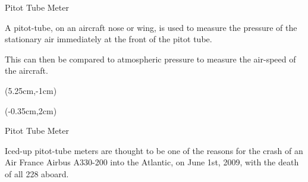 \documentclass[9pt,xcolor={svgnames, x11names},professionalfonts, mathserif]{beamer}
\begin{document}


\begin{frame}{Pitot Tube Meter}
	\vspace*{-0.25cm}
	\begin{center}
		\begin{minipage}{0.9\textwidth}
			\raggedright
			A pitot-tube, on an aircraft nose or wing, is used to measure the pressure of the stationary air immediately
			at the front of the pitot tube. \par \medskip
			This can then be compared to atmospheric pressure to measure the air-speed of the aircraft.
		\end{minipage}
	\end{center}
\end{frame}


\begin{frame}
	\begin{textblock*}{6cm}(5.25cm,-1cm)
	\end{textblock*}
	\begin{textblock*}{6cm}(-0.35cm,2cm)
	\end{textblock*}
\end{frame}

\begin{frame}{Pitot Tube Meter}
	\vspace*{-0.25cm}
	\begin{center}
		\begin{minipage}{0.6\textwidth}
			\raggedright
			Iced-up pitot-tube meters are thought to be one of the reasons for the crash of an Air France Airbus A330-200
			into the Atlantic, on June 1st, 2009, with the death of all 228 aboard.
		\end{minipage}
	\end{center}
\end{frame}
\end{document}
